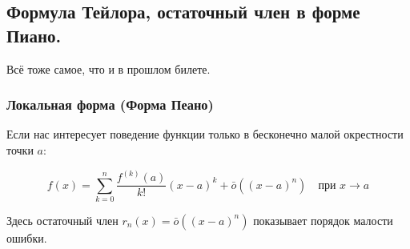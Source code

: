 \subsection{Формула Тейлора, остаточный член в форме Пиано.}

Всё тоже самое, что и в прошлом билете.

\subsubsection*{Локальная форма (Форма Пеано)}

Если нас интересует поведение функции только в бесконечно малой окрестности точки $a$:

\begin{tcolorbox}[title=Локальная формула Тейлора]
    \[ f(x) = \sum_{k=0}^{n} \frac{f^{(k)}(a)}{k!}(x-a)^k + \bar{o}((x-a)^n) \quad \text{при } x \to a \]
\end{tcolorbox}
Здесь остаточный член $r_n(x) = \bar{o}((x-a)^n)$ показывает порядок малости ошибки.
